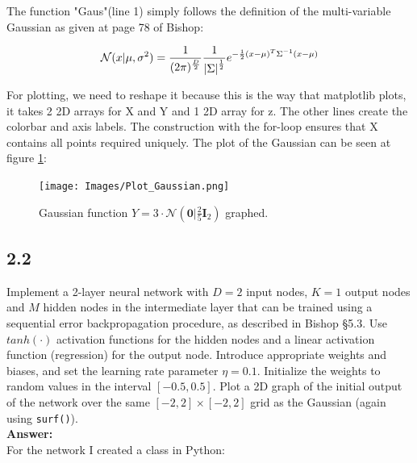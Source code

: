 \documentclass[a4paper]{article}
\begin{document}
The function "Gaus"(line 1) simply follows the definition of the multi-variable Gaussian as given at page 78 of Bishop:

\begin{equation}
\mathcal N (x|\mu,\sigma^2) = \frac{1}{(2\pi)^{\frac{D}{2}}} \frac{1}{\abs{\Sigma}^{\frac{1}{2}}} e^{-\frac{1}{2}(x-\mu)^T\Sigma^{-1} (x-\mu)}
\end{equation}

For plotting, we need to reshape it because this is the way that matplotlib plots, it takes 2 2D arrays for X and Y and 1 2D array for z. The other lines create the colorbar and axis labels.
The construction with the for-loop ensures that X contains all points required uniquely.
The plot of the Gaussian can be seen at figure \ref{GausPlot}:

\begin{figure}[H]
\texttt{[image: Images/Plot\_Gaussian.png]}
\caption{Gaussian function $Y = 3 \cdot \mathcal{N}(\textbf{0}|\frac{2}{5}\textbf{I}_2)$ graphed.}
\label{GausPlot}
\end{figure}


\subsection*{2.2}

Implement a 2-layer neural network with $D = 2$ input nodes, $K = 1$ output nodes and $M$ hidden nodes in the intermediate layer that can be trained using a sequential error backpropagation procedure, as described in Bishop §5.3. Use $tanh(\cdot)$ activation functions for the hidden nodes and a linear activation function (regression) for the output node. Introduce appropriate weights and biases, and set the learning rate parameter $\eta = 0.1$. Initialize the weights to random values in the interval $[-0.5,0.5]$. Plot a 2D graph of the initial output of the network over the same $[-2,2] \times [-2,2]$ grid as the Gaussian (again using \texttt{surf()}).\\

\textbf{Answer:}\\

For the network I created a class in Python:
\end{document}

